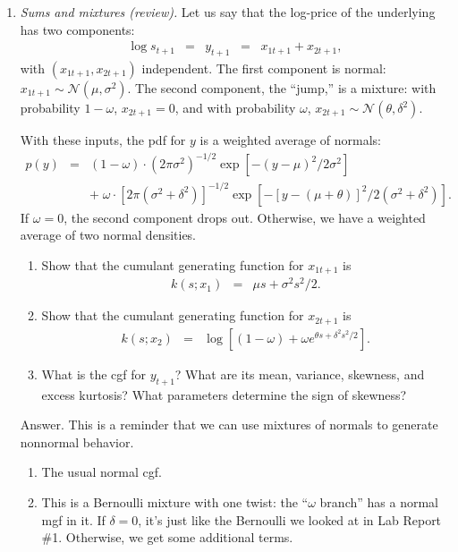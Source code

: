 \documentclass[11pt]{article}
\begin{document}
\begin{enumerate}
\item {\it Sums and mixtures (review).\/}
Let us say that the log-price of the underlying has two components:
\begin{eqnarray*}
    \log s_{t+1} &=& y_{t+1} \;\;=\;\; x_{1t+1} + x_{2t+1},
\end{eqnarray*}
with $( x_{1t+1}, x_{2t+1})$ independent.
The first component is normal:
$ x_{1t+1} \sim \mathcal{N}(\mu,\sigma^2)$.
The second component, the ``jump,'' is a mixture:
with probability $1-\omega$, $ x_{2t+1} = 0$,
and with probability $\omega$,
$ x_{2t+1} \sim \mathcal{N}(\theta,\delta^2)$.

With these inputs, the pdf for $y$ is a weighted average of normals:
\begin{eqnarray}
    p(y) &=& (1-\omega) \cdot ( 2 \pi \sigma^2)^{-1/2} \exp[ - (y-\mu)^2/2\sigma^2]
            \nonumber \\
    && + \; \omega \cdot [ 2 \pi (\sigma^2+\delta^2)]^{-1/2}
            \exp[ - [y-(\mu+\theta)]^2/2(\sigma^2 + \delta^2)] .
            \label{eq:bernoulli-mixture}
\end{eqnarray}
If $\omega = 0$, the second component drops out.
Otherwise, we have a weighted average of two normal densities.

\begin{enumerate}
\item Show that the cumulant generating function for $x_{1t+1}$ is
\begin{eqnarray*}
    k (s; x_1) &=&  \mu s + \sigma^2 s^2 / 2 .
\end{eqnarray*}

\item Show that the cumulant generating function for $x_{2t+1}$ is
\begin{eqnarray*}
    k (s; x_2) &=& \log \left[ (1-\omega) + \omega e^{ \theta s + \delta^2 s^2 / 2 }
            \right] .
\end{eqnarray*}

\item What is the cgf for $y_{t+1}$?
What are its mean, variance, skewness, and excess kurtosis?
What parameters determine the sign of skewness?
\end{enumerate}
%
Answer.
This is a reminder that we can use mixtures of normals
to generate nonnormal behavior.
\begin{enumerate}
\item  The usual normal cgf.
\item This is a Bernoulli mixture with one twist:
the ``$\omega$ branch'' has a normal mgf in it.
If $\delta = 0$, it's just like the Bernoulli we looked at in
Lab Report \#1.
Otherwise, we get some additional terms.


\end{enumerate}
\end{enumerate}
\end{document}

